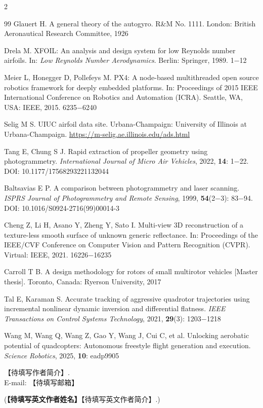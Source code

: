 \documentclass{aas}
\begin{document}
\begin{multicols}{2}
\begin{thebibliography}{99}
 Glauert H. A general theory of the autogyro. R\&M No. 1111. London: British Aeronautical Research Committee, 1926

 Drela M. XFOIL: An analysis and design system for low Reynolds number airfoils. In: {\sl Low Reynolds Number Aerodynamics}. Berlin: Springer, 1989. 1$-$12

 Meier L, Honegger D, Pollefeys M. PX4: A node-based multithreaded open source robotics framework for deeply embedded platforms. In: Proceedings of 2015 IEEE International Conference on Robotics and Automation (ICRA). Seattle, WA, USA: IEEE, 2015. 6235$-$6240

 Selig M S. UIUC airfoil data site. Urbana-Champaign: University of Illinois at Urbana-Champaign. \url{https://m-selig.ae.illinois.edu/ads.html}

 Tang E, Chung S J. Rapid extraction of propeller geometry using photogrammetry. {\sl International Journal of Micro Air Vehicles}, 2022, {\bf 14}: 1$-$22. DOI: 10.1177/17568293221132044

 Baltsavias E P. A comparison between photogrammetry and laser scanning. {\sl ISPRS Journal of Photogrammetry and Remote Sensing}, 1999, {\bf 54}(2$-$3): 83$-$94. DOI: 10.1016/S0924-2716(99)00014-3

 Cheng Z, Li H, Asano Y, Zheng Y, Sato I. Multi-view 3D reconstruction of a texture-less smooth surface of unknown generic reflectance. In: Proceedings of the IEEE/CVF Conference on Computer Vision and Pattern Recognition (CVPR). Virtual: IEEE, 2021. 16226$-$16235

 Carroll T B. A design methodology for rotors of small multirotor vehicles [Master thesis]. Toronto, Canada: Ryerson University, 2017

 Tal E, Karaman S. Accurate tracking of aggressive quadrotor trajectories using incremental nonlinear dynamic inversion and differential flatness. {\sl IEEE Transactions on Control Systems Technology}, 2021, {\bf 29}(3): 1203$-$1218

 Wang M, Wang Q, Wang Z, Gao Y, Wang J, Cui C, et al. Unlocking aerobatic potential of quadcopters: Autonomous freestyle flight generation and execution. {\sl Science Robotics}, 2025, {\bf 10}: eadp9905

\end{thebibliography}

\begin{biographynophoto}
\quad 【待填写作者简介】.\\E-mail: 【待填写邮箱】

\noindent({\bf 【待填写英文作者姓名】}\quad 【待填写英文作者简介】.)
\end{biographynophoto}

\end{multicols}
\end{document}

